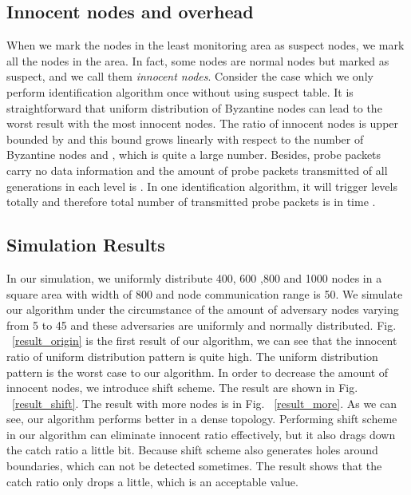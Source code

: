 \documentclass[conference]{IEEEtran}
\begin{document}
\subsection{Innocent nodes and overhead}
When we mark the nodes in the least monitoring area as suspect nodes, we mark all the nodes in the area. In fact, some nodes are normal nodes but marked as suspect, and we call them \emph{innocent nodes}.  Consider the case which we only perform identification algorithm once without using suspect table. It is straightforward that uniform distribution of Byzantine nodes can lead to the worst result with the most innocent nodes. The ratio of innocent nodes is upper bounded by  and this bound grows linearly with respect to the number of Byzantine nodes and , which is quite a large number. Besides, probe packets carry no data information and the amount of probe packets transmitted of all generations in each level is . In one identification algorithm, it will trigger  levels totally and therefore total number of transmitted probe packets is  in time .

\subsection{Simulation Results}
In our simulation, we uniformly distribute 400, 600 ,800 and 1000 nodes in a square area with width of 800 and node communication range is 50. We simulate our algorithm under the circumstance of the amount of adversary nodes varying from 5 to 45 and these adversaries are uniformly and normally distributed. Fig. ~\ref{result_origin} is the first result of our algorithm, we can see that the innocent ratio of uniform distribution pattern is quite high. The uniform distribution pattern is the worst case to our algorithm. In order to decrease the amount of innocent nodes, we introduce shift scheme. The result are shown in Fig. ~\ref{result_shift}. The result with more nodes is in Fig. ~\ref{result_more}. As we can see, our algorithm performs better in a dense topology. Performing shift scheme in our algorithm can eliminate innocent ratio effectively, but it also drags down the catch ratio a little bit. Because shift scheme also generates holes around boundaries, which can not be detected sometimes. The result shows that the catch ratio only drops a little, which is an acceptable value.
\end{document}
